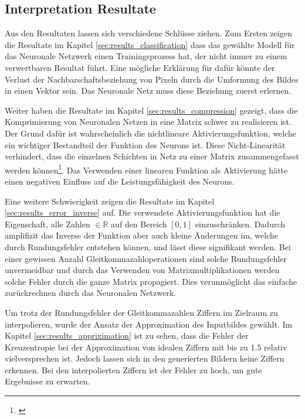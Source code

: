 \documentclass[Interploate_hadwritten_Digits.tex]{subfiles}
\begin{document}
	\subsection{Interpretation Resultate}
	Aus den Resultaten lassen sich verschiedene Schlüsse ziehen. Zum Ersten zeigen die Resultate im Kapitel \ref{sec:results_classification} dass das gewählte Modell für das Neuronale Netzwerk einen Trainingsprozess hat, der nicht immer zu einem verwertbaren Resultat führt. Eine mögliche Erklärung für dafür könnte der Verlust der Nachbarschaftsbeziehung von Pixeln durch die Umformung des Bildes in einen Vektor sein. Das Neuronale Netz muss diese Beziehung zuerst erlernen.
	
	Weiter haben die Resultate im Kapitel \ref{sec:results_compression} gezeigt, dass die Komprimierung von Neuronalen Netzen in eine Matrix schwer zu realisieren ist. Der Grund dafür ist wahrscheinlich die nichtlineare Aktivierungsfunktion, welche ein wichtiger Bestandteil der Funktion des Neurons ist. Diese Nicht-Linearität verhindert, dass die einzelnen Schichten in Netz zu einer Matrix zusammengefasst werden können\footnote{\cite{standford-cs231n-convolutional_neuronal_networks_for_visual_recognition}}. Das Verwenden einer linearen Funktion als Aktivierung hätte einen negativen Einfluss auf die Leistungsfähigkeit des Neurons.
	
	Eine weitere Schwierigkeit zeigen die Resultate im Kapitel \ref{sec:results_error_inverse} auf. Die verwendete Aktivierungsfunktion hat die Eigenschaft, alle Zahlen $ \in \mathbb{R} $ auf den Bereich $ [0, 1] $ einzuschränken. Dadurch amplifizit das Inverse der Funktion aber auch kleine Änderungen im, welche durch Rundungsfehler entstehen können, und lässt diese signifikant werden. Bei einer gewissen Anzahl Gleitkommazahloperationen sind solche Rundungsfehler unvermeidbar und durch das Verwenden von Matrixmultiplikationen werden solche Fehler durch die ganze Matrix propagiert. Dies verunmöglicht das einfache zurückrechnen durch das Neuronalen Netzwerk.
	
	Um trotz der Rundungsfehler der Gleitkommazahlen Ziffern im Zielraum zu interpolieren, wurde der Ansatz der Approximation des Inputbildes gewählt. Im Kapitel \ref{sec:results_appriximation} ist zu sehen, dass die Fehler der Kreuzentropie bei der Approximation von idealen Ziffern mit bis zu 1.5 relativ vielversprechen ist. Jedoch lassen sich in den generierten Bildern keine Ziffern erkennen. Bei den interpolierten Ziffern ist der Fehler zu hoch, um gute Ergebnisse zu erwarten. 
	
\end{document}
